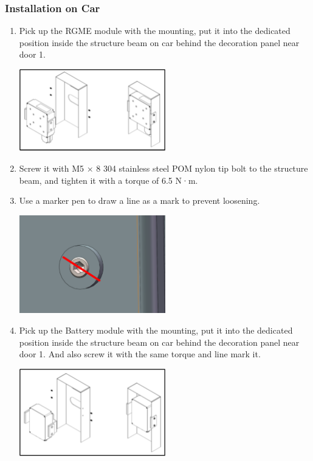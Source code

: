 \documentclass{article}
\begin{document}
\subsubsection{Installation on Car}
\begin{enumerate}
    \item Pick up the RGME module with the mounting, put it into the dedicated position inside the structure beam on car behind the decoration panel near door 1.\\
    \begin{center}
        \includegraphics[width=0.5\textwidth]{RGME ready.png}
    \end{center}
    \item Screw it with M5 × 8 304 stainless steel POM nylon tip bolt to the structure beam, and tighten it with a torque of 6.5 N·m.\\
    \item Use a marker pen to draw a line as a mark to prevent loosening.\\
    \begin{center}
        \includegraphics[width=0.5\textwidth]{Mark2.png}
    \end{center}
    \item Pick up the Battery module with the mounting, put it into the dedicated position inside the structure beam on car behind the decoration panel near door 1. And also screw it with the same torque and line mark it.\\
    \begin{center}
        \includegraphics[width=0.5\textwidth]{Battery ready.png}

\end{center}
\end{enumerate}
\end{document}
